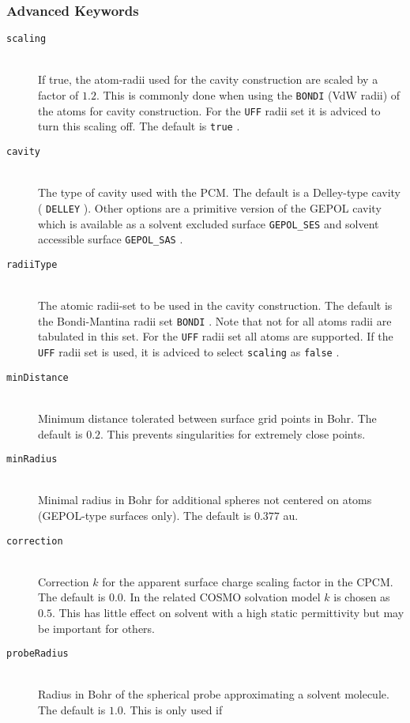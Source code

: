 \documentclass[bibliography=totocnumbered,a4paper,10pt,oneside]{scrbook}
\newcommand{\ttt}[1]{%
  \begingroup\setlength{\fboxsep}{1pt}%
  \colorbox{serenity-green!30}{\texttt{\hspace*{2pt}\vphantom{(g}#1\hspace*{2pt}}}%
  \endgroup
}
\begin{document}
\subsubsection{Advanced Keywords}
\begin{description}
    \item [\texttt{scaling}]\hfill \\
    If true, the atom-radii used for the cavity construction are scaled by a factor of $1.2$. This is commonly done 
    when using the \texttt{BONDI} (VdW radii) of the atoms for cavity construction. For the \ttt{UFF} radii set it is 
    adviced to turn this scaling off. The default is \ttt{true}.
    \item [\texttt{cavity}]\hfill \\
    The type of cavity used with the PCM. The default is a Delley-type cavity (\ttt{DELLEY}). Other options are 
    a primitive version of the GEPOL cavity which is available as a solvent excluded surface \ttt{GEPOL\_SES} and 
    solvent accessible surface \ttt{GEPOL\_SAS}.
    \item [\texttt{radiiType}]\hfill \\
    The atomic radii-set to be used in the cavity construction. The default is the Bondi-Mantina radii set \ttt{BONDI}.
    Note that not for all atoms radii are tabulated in this set. For the \ttt{UFF} radii set all atoms are supported.
    If the \texttt{UFF} radii set is used, it is adviced to select \ttt{scaling} as \ttt{false}.
    \item [\texttt{minDistance}]\hfill \\
    Minimum distance tolerated between surface grid points in Bohr. The default is $0.2$. This prevents singularities
    for extremely close points.
    \item [\texttt{minRadius}]\hfill \\
    Minimal radius in Bohr for additional spheres not centered on atoms (GEPOL-type surfaces only). The default is $0.377$ au.
    \item [\texttt{correction}]\hfill \\
    Correction $k$ for the apparent surface charge scaling factor in the CPCM. The default is $0.0$. In the related 
    COSMO solvation model $k$ is chosen as $0.5$. This has little effect on solvent with a high static permittivity
    but may be important for others.
    \item [\texttt{probeRadius}]\hfill \\
    Radius in Bohr of the spherical probe approximating a solvent molecule. The default is $1.0$. This is only used if

\end{description}
\end{document}

